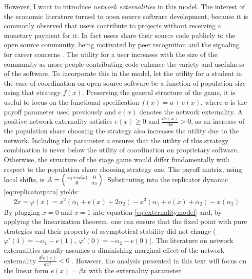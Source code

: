 However, I want to introduce \textit{network externalities} in this model. 
The interest of the economic literature turned to open source software 
development, because it is commonly observed that users contribute to 
projects without receiving a monetary payment for it.
In fact users share their source code publicly to the open source community,
being motivated by peer recognition and the signaling for career concerns
\parencite[21]{lerner_simple_2002}.
The utility for a user increases with the size of the community as 
more people contributing code enhance the variety and usefulness of the 
software. 
To incorporate this in the model, let the utility for a student 
in the case of coordination on open source software be a function of 
population size using that strategy $f(x)$. 
Preserving the general structure of the
game, it is useful to focus on the functional specification 
$f(x) = a + e(x)$, where $a$ is the payoff parameter used 
previously and $e(x)$ denotes the network externality. 
A positive network externality satisfies $e(x)\geq 0$ and 
$\frac{de(x)}{dx}>0$, 
as an increase of the population share choosing the strategy
also increases the utility due to the network. 
Including the parameter $a$ ensures that the utility of this 
strategy combination is never below the utility of coordination on 
proprietary software. Otherwise, the structure of the stage game would 
differ fundamentally with respect to the population share choosing strategy 
one. The payoff matrix, using local shifts, is 
$A=\begin{psmallmatrix}\alpha_1+u(x) && 0 \\ 0&& \alpha_2\end{psmallmatrix}$. 
Substituting into the replicator dynamic  \ref{eq:replicatorpara} yields:
\begin{alignat}{2}
        \dot{x} = \varphi(x) = x^2(\alpha_1+e(x) +2\alpha_2 ) 
        - x^3(\alpha_1+e(x)+\alpha_2) - x(\alpha_2)
        \label{eq:externalitymodel}
\end{alignat}
By plugging $x=0$ and $x=1$ into equation \eqref{eq:externalitymodel} and, 
by applying the linearization theorem, one can ensure 
that the fixed point with pure strategies and their
property of asymptotical stability did not change
($\varphi'(1) = -\alpha_1 -e(1),\ \varphi'(0) = -\alpha_2 -e(0)$).
The literature on network externalities usually assumes a diminishing
marginal effect of the network externality $\frac{d^2e(x)}{dx^2} <0$ 
\parencite[73]{lin_impact_2008}. However, the analysis presented in this text
will focus on the linear form $e(x) = \beta x$ with the externality parameter
